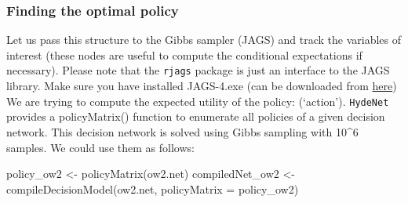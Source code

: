 \documentclass[
]{article}
\newenvironment{Shaded}{\begin{snugshade}}{\end{snugshade}}
\newcommand{\AttributeTok}[1]{\textcolor[rgb]{0.77,0.63,0.00}{#1}}
\newcommand{\FunctionTok}[1]{\textcolor[rgb]{0.00,0.00,0.00}{#1}}
\newcommand{\NormalTok}[1]{#1}
\newcommand{\OtherTok}[1]{\textcolor[rgb]{0.56,0.35,0.01}{#1}}
\begin{document}
\hypertarget{finding-the-optimal-policy-3}{%
\subsubsection{Finding the optimal policy}\label{finding-the-optimal-policy-3}}

Let us pass this structure to the Gibbs sampler (JAGS) and track the variables of interest (these nodes are useful to compute the conditional expectations if necessary).
Please note that the \texttt{rjags} package is just an interface to the JAGS library. Make sure you have installed JAGS-4.exe (can be downloaded from \href{http://www.sourceforge.net/projects/mcmc-jags/files}{here})
We are trying to compute the expected utility of the policy: (`action').
\texttt{HydeNet} provides a policyMatrix() function to enumerate all policies of a given decision network. This decision network is solved using Gibbs sampling with 10\^{}6 samples. We could use them as follows:

\begin{Shaded}
\begin{Highlighting}[]
\NormalTok{policy\_ow2 }\OtherTok{\textless{}{-}} \FunctionTok{policyMatrix}\NormalTok{(ow2.net)}
\NormalTok{compiledNet\_ow2 }\OtherTok{\textless{}{-}} \FunctionTok{compileDecisionModel}\NormalTok{(ow2.net, }\AttributeTok{policyMatrix =}\NormalTok{ policy\_ow2)}
\end{Highlighting}
\end{Shaded}
\end{document}
